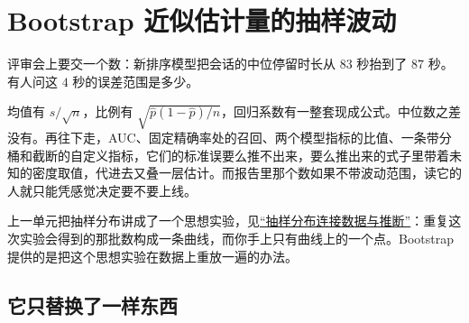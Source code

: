 \section{Bootstrap 近似估计量的抽样波动}
\label{sec:11-Mathematical-Statistics/06-Resampling-and-Model-Selection/01}

评审会上要交一个数：新排序模型把会话的中位停留时长从 \(83\) 秒抬到了 \(87\) 秒。有人问这 \(4\) 秒的误差范围是多少。

均值有 \(s/\sqrt n\)，比例有 \(\sqrt{\hat p(1-\hat p)/n}\)，回归系数有一整套现成公式。中位数之差没有。再往下走，AUC、固定精确率处的召回、两个模型指标的比值、一条带分桶和截断的自定义指标，它们的标准误要么推不出来，要么推出来的式子里带着未知的密度取值，代进去又叠一层估计。而报告里那个数如果不带波动范围，读它的人就只能凭感觉决定要不要上线。

上一单元把抽样分布讲成了一个思想实验，见\hyperref[sec:11-Mathematical-Statistics/01-Statistical-Models/03]{``抽样分布连接数据与推断''}：重复这次实验会得到的那批数构成一条曲线，而你手上只有曲线上的一个点。Bootstrap 提供的是把这个思想实验在数据上重放一遍的办法。

\subsection{它只替换了一样东西}

